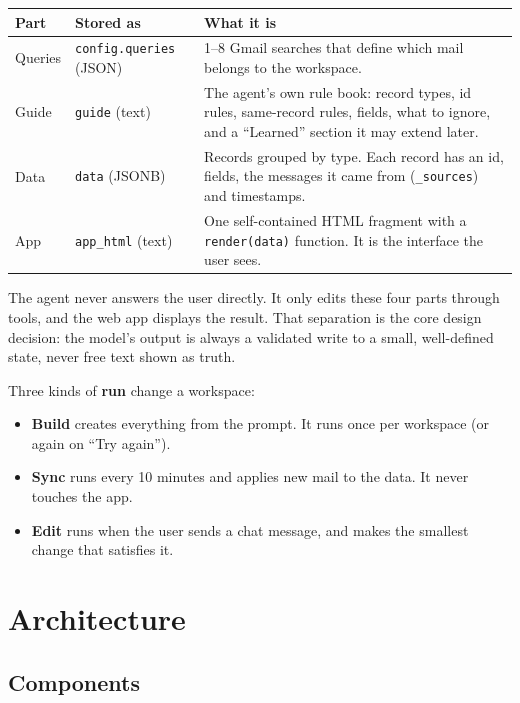 \documentclass[10pt,a4paper]{article}
\newcommand{\code}[1]{\texttt{\small #1}}
\begin{document}
\begin{center}\small
\begin{tabularx}{\linewidth}{@{}P{2.2cm}P{3.4cm}L@{}}
\toprule
\textbf{Part} & \textbf{Stored as} & \textbf{What it is} \\
\midrule
Queries & \code{config.queries} (JSON) & 1--8 Gmail searches that define which mail belongs to the workspace. \\
Guide & \code{guide} (text) & The agent's own rule book: record types, id rules, same-record rules, fields, what to ignore, and a ``Learned'' section it may extend later. \\
Data & \code{data} (JSONB) & Records grouped by type. Each record has an id, fields, the messages it came from (\code{\_sources}) and timestamps. \\
App & \code{app\_html} (text) & One self-contained HTML fragment with a \code{render(data)} function. It is the interface the user sees. \\
\bottomrule
\end{tabularx}
\end{center}

The agent never answers the user directly. It only edits these four parts through tools, and
the web app displays the result. That separation is the core design decision: the model's
output is always a validated write to a small, well-defined state, never free text shown as
truth.

Three kinds of \textbf{run} change a workspace:
\begin{itemize}
\item \textbf{Build} creates everything from the prompt. It runs once per workspace (or again on ``Try again'').
\item \textbf{Sync} runs every 10 minutes and applies new mail to the data. It never touches the app.
\item \textbf{Edit} runs when the user sends a chat message, and makes the smallest change that satisfies it.
\end{itemize}

\section{Architecture}

\subsection{Components}
\end{document}
